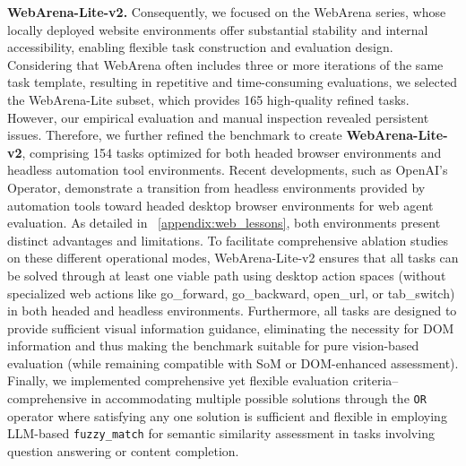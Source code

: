 \textbf{WebArena-Lite-v2.}
Consequently, we focused on the WebArena series, whose locally deployed website environments offer substantial stability and internal accessibility, enabling flexible task construction and evaluation design. Considering that WebArena often includes three or more iterations of the same task template, resulting in repetitive and time-consuming evaluations, we selected the WebArena-Lite subset, which provides 165 high-quality refined tasks. However, our empirical evaluation and manual inspection revealed persistent issues. Therefore, we further refined the benchmark to create \textbf{WebArena-Lite-v2}, comprising 154 tasks optimized for both headed browser environments and headless automation tool environments. Recent developments, such as OpenAI's Operator, demonstrate a transition from headless environments provided by automation tools toward headed desktop browser environments for web agent evaluation. As detailed in ~\ref{appendix:web_lessons}, both environments present distinct advantages and limitations. To facilitate comprehensive ablation studies on these different operational modes, WebArena-Lite-v2 ensures that all tasks can be solved through at least one viable path using desktop action spaces (without specialized web actions like go\_forward, go\_backward, open\_url, or tab\_switch) in both headed and headless environments. Furthermore, all tasks are designed to provide sufficient visual information guidance, eliminating the necessity for DOM information and thus making the benchmark suitable for pure vision-based evaluation (while remaining compatible with SoM or DOM-enhanced assessment). Finally, we implemented comprehensive yet flexible evaluation criteria--comprehensive in accommodating multiple possible solutions through the \texttt{\textbar OR\textbar} operator where satisfying any one solution is sufficient and flexible in employing LLM-based \texttt{fuzzy\_match} for semantic similarity assessment in tasks involving question answering or content completion.

